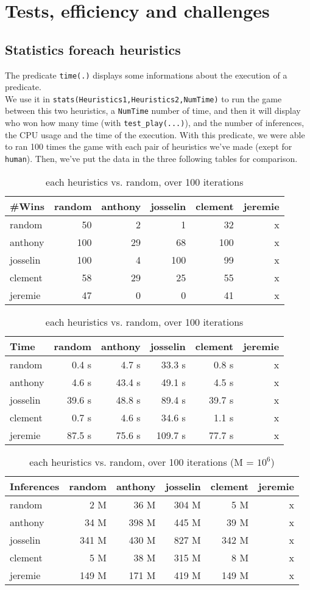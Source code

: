 \documentclass[a4paper,11pt]{article}
\newcommand{\tw}[1]{\texttt{#1}}
\newcommand{\mytable}[3]{
	\begin{table}[ht]
		\begin{center}
			\begin{tabular}{#2}
				#3
			\end{tabular}
		\caption{#1}
		\end{center}
	\end{table}
}
\begin{document}
	\newpage
	\section{Tests, efficiency and challenges}	
		\subsection{Statistics foreach heuristics}
			The predicate \tw{time(.)} displays some informations about the execution of a predicate. \\
			We use it in \tw{stats(Heuristics1,Heuristics2,NumTime)} to run the game between this two heuristics, a \tw{NumTime} number of time, and then it will display who won how many time (with \tw{test\_play(...)}), and the number	of inferences, the CPU usage and the time of the execution. With this predicate, we were able to ran 100 times the game with each pair of heuristics we've made (exept for \tw{human}). Then, we've put the data in the three following tables for comparison.

			\mytable{each heuristics vs. random, over 100 iterations}{|l||r|r|r|r|r|}{
				\hline
				\#Wins		& random	& anthony	& josselin	& clement	& jeremie	\\\hline\hline
				random		& 50		& 2			& 1			& 32		& x			\\\hline
				anthony		& 100		& 29		& 68		& 100		& x			\\\hline
				josselin	& 100		& 4			& 100		& 99		& x			\\\hline
				clement		& 58		& 29		& 25		& 55		& x			\\\hline
				jeremie		& 47		& 0			& 0			& 41		& x			\\\hline
			}

			\mytable{each heuristics vs. random, over 100 iterations}{|l||r|r|r|r|r|}{
				\hline
				Time		& random	& anthony	& josselin		& clement	& jeremie	\\\hline\hline
				random		& 0.4 s		& 4.7 s		& 33.3 s		& 0.8 s		& x			\\\hline
				anthony		& 4.6 s		& 43.4 s	& 49.1 s		& 4.5 s		& x			\\\hline
				josselin	& 39.6 s	& 48.8 s	& 89.4 s		& 39.7 s	& x			\\\hline
				clement		& 0.7 s		& 4.6 s		& 34.6 s		& 1.1 s		& x			\\\hline
				jeremie		& 87.5 s	& 75.6 s	& 109.7 s		& 77.7 s	& x			\\\hline
			}

			\mytable{each heuristics vs. random, over 100 iterations (M = $10^6$)}{|l||r|r|r|r|r|}{
				\hline
				Inferences		& random	& anthony	& josselin	& clement	& jeremie	\\\hline\hline
				random			& 2 M		& 36 M		& 304 M		& 5 M		& x			\\\hline
				anthony			& 34 M		& 398 M		& 445 M		& 39 M		& x			\\\hline
				josselin		& 341 M		& 430 M		& 827 M		& 342 M		& x			\\\hline
				clement			& 5 M		& 38 M		& 315 M		& 8 M		& x			\\\hline
				jeremie			& 149 M		& 171 M		& 419 M		& 149 M		& x			\\\hline
			}
\end{document}
